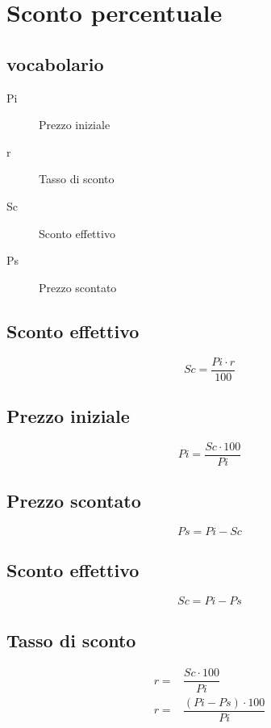 \chapter{Sconto percentuale}
\section{vocabolario}
\begin{description}
	\item[Pi] Prezzo iniziale
	\item[r] Tasso di sconto
	\item[Sc] Sconto effettivo
	\item[Ps] Prezzo scontato
\end{description}
\section{Sconto effettivo}
\begin{equation}
Sc=\dfrac{Pi\cdot r}{100}
\end{equation}
\section{Prezzo iniziale}
\begin{equation}
Pi=\dfrac{Sc\cdot 100}{Pi}
\end{equation}
\section{Prezzo scontato}
\begin{equation}
Ps=Pi-Sc
\end{equation}
\section{Sconto effettivo}
\begin{equation}
Sc=Pi-Ps
\end{equation}
\section{Tasso di sconto}
\begin{align}
r=&\dfrac{Sc\cdot 100}{Pi}\\
r=&\dfrac{(Pi-Ps)\cdot 100}{Pi}
\end{align}